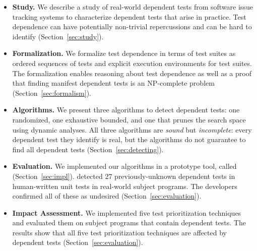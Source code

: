 \begin{itemize}

  \item \textbf{Study.} We describe a study of \dtnum real-world
  dependent tests from \repnum software issue tracking
  systems to characterize dependent tests that
  arise in practice.  Test dependence can have
  potentially non-trivial repercussions and can be hard to identify
  (Section~\ref{sec:study}).

\item \textbf{Formalization.} We formalize test dependence
  in terms of test suites as ordered sequences of tests and explicit execution
  environments for test suites.  The formalization enables reasoning about test dependence
  as well as a proof that finding manifest dependent tests is an NP-complete
  problem (Section~\ref{sec:formalism}).

  \item \textbf{Algorithms.} We present three algorithms
  to detect dependent tests:
  one randomized, one exhaustive bounded, and one that prunes the search
  space using dynamic analyses.
  All three algorithms are \emph{sound} but \emph{incomplete}:
  every dependent test they identify is real, but the algorithms
  do not guarantee to find all dependent tests (Section~\ref{sec:detecting}). 

  \item \textbf{Evaluation.} We implemented our algorithms in a prototype
  tool, called \ourtool (Section~\ref{sec:impl}).
  \ourtool detected 27 previously-unknown dependent tests in human-written
  unit tests in \subjnum real-world subject programs.
  The developers confirmed all of these as
  undesired (Section~\ref{sec:evaluation}).

  \item \textbf{Impact Assessment.} We implemented five test prioritization
  techniques and evaluated them on \subjnum subject programs
  that contain dependent tests. The results show that all
  five test prioritization techniques are affected by dependent tests
  (Section~\ref{sec:evaluation}).

\end{itemize}



